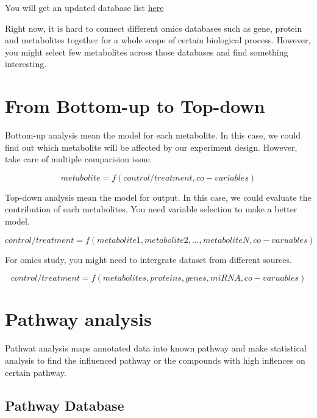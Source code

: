 \documentclass[
]{book}
\begin{document}
You will get an updated database list \href{http://metabolomicssociety.org/resources/metabolomics-databases}{here}

Right now, it is hard to connect different omics databases such as gene, protein and metabolites together for a whole scope of certain biological process. However, you might select few metabolites across those databases and find something interesting.

\hypertarget{from-bottom-up-to-top-down}{%
\section{From Bottom-up to Top-down}\label{from-bottom-up-to-top-down}}

Bottom-up analysis mean the model for each metabolite. In this case, we could find out which metabolite will be affected by our experiment design. However, take care of multiple comparision issue.

\[
metabolite = f(control/treatment, co-variables)
\]

Top-down analysis mean the model for output. In this case, we could evaluate the contribution of each metabolites. You need variable selection to make a better model.

\[
control/treatment = f(metabolite 1,metabolite 2,...,metaboliteN,co-varuables)
\]

For omics study, you might need to intergrate dataset from different sources.

\[
control/treatment = f(metabolites, proteins, genes, miRNA,co-varuables)
\]

\hypertarget{pathway-analysis}{%
\section{Pathway analysis}\label{pathway-analysis}}

Pathwat analysis maps annotated data into known pathway and make statistical analysis to find the influenced pathway or the compounds with high inflences on certain pathway.

\hypertarget{pathway-database}{%
\subsection{Pathway Database}\label{pathway-database}}
\end{document}
